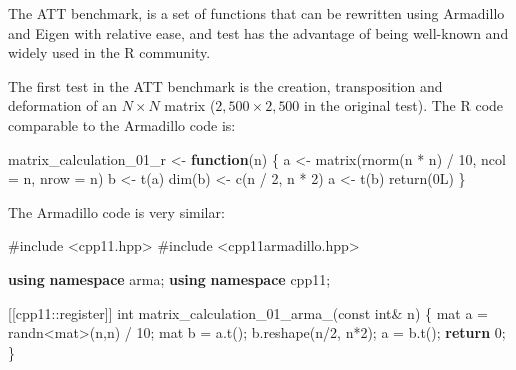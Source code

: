 \documentclass[12pt]{article}
\newenvironment{Shaded}{\begin{snugshade}}{\end{snugshade}}
\newcommand{\AttributeTok}[1]{\textcolor[rgb]{0.40,0.45,0.13}{#1}}
\newcommand{\ControlFlowTok}[1]{\textcolor[rgb]{0.00,0.23,0.31}{\textbf{#1}}}
\newcommand{\DataTypeTok}[1]{\textcolor[rgb]{0.68,0.00,0.00}{#1}}
\newcommand{\DecValTok}[1]{\textcolor[rgb]{0.68,0.00,0.00}{#1}}
\newcommand{\FunctionTok}[1]{\textcolor[rgb]{0.28,0.35,0.67}{#1}}
\newcommand{\ImportTok}[1]{\textcolor[rgb]{0.00,0.46,0.62}{#1}}
\newcommand{\KeywordTok}[1]{\textcolor[rgb]{0.00,0.23,0.31}{\textbf{#1}}}
\newcommand{\NormalTok}[1]{\textcolor[rgb]{0.00,0.23,0.31}{#1}}
\newcommand{\OperatorTok}[1]{\textcolor[rgb]{0.37,0.37,0.37}{#1}}
\newcommand{\OtherTok}[1]{\textcolor[rgb]{0.00,0.23,0.31}{#1}}
\newcommand{\PreprocessorTok}[1]{\textcolor[rgb]{0.68,0.00,0.00}{#1}}
\newcommand{\SpecialCharTok}[1]{\textcolor[rgb]{0.37,0.37,0.37}{#1}}
\newcommand{\VariableTok}[1]{\textcolor[rgb]{0.07,0.07,0.07}{#1}}
\begin{document}
The ATT benchmark, is a set of functions that can be rewritten using
Armadillo and Eigen with relative ease, and test has the advantage of
being well-known and widely used in the R community.

The first test in the ATT benchmark is the creation, transposition and
deformation of an \(N \times N\) matrix (\(2,500 \times 2,500\) in the
original test). The R code comparable to the Armadillo code is:

\begin{Shaded}
\begin{Highlighting}[]
\NormalTok{matrix\_calculation\_01\_r }\OtherTok{\textless{}{-}} \ControlFlowTok{function}\NormalTok{(n) \{}
\NormalTok{  a }\OtherTok{\textless{}{-}} \FunctionTok{matrix}\NormalTok{(}\FunctionTok{rnorm}\NormalTok{(n }\SpecialCharTok{*}\NormalTok{ n) }\SpecialCharTok{/} \DecValTok{10}\NormalTok{, }\AttributeTok{ncol =}\NormalTok{ n, }\AttributeTok{nrow =}\NormalTok{ n)}
\NormalTok{  b }\OtherTok{\textless{}{-}} \FunctionTok{t}\NormalTok{(a)}
  \FunctionTok{dim}\NormalTok{(b) }\OtherTok{\textless{}{-}} \FunctionTok{c}\NormalTok{(n }\SpecialCharTok{/} \DecValTok{2}\NormalTok{, n }\SpecialCharTok{*} \DecValTok{2}\NormalTok{)}
\NormalTok{  a }\OtherTok{\textless{}{-}} \FunctionTok{t}\NormalTok{(b)}
  \FunctionTok{return}\NormalTok{(}\DecValTok{0}\NormalTok{L)}
\NormalTok{\}}
\end{Highlighting}
\end{Shaded}

The Armadillo code is very similar:

\begin{Shaded}
\begin{Highlighting}[]
\PreprocessorTok{\#include }\ImportTok{\textless{}cpp11.hpp\textgreater{}}
\PreprocessorTok{\#include }\ImportTok{\textless{}cpp11armadillo.hpp\textgreater{}}

\KeywordTok{using} \KeywordTok{namespace}\NormalTok{ arma}\OperatorTok{;}
\KeywordTok{using} \KeywordTok{namespace}\NormalTok{ cpp11}\OperatorTok{;}

\OperatorTok{[[}\AttributeTok{cpp11}\OperatorTok{::}\AttributeTok{register}\OperatorTok{]]} \DataTypeTok{int} \VariableTok{matrix\_calculation\_01\_arma\_}\OperatorTok{(}\AttributeTok{const} \DataTypeTok{int}\OperatorTok{\&}\NormalTok{ n}\OperatorTok{)} \OperatorTok{\{}
\NormalTok{  mat a }\OperatorTok{=}\NormalTok{ randn}\OperatorTok{\textless{}}\NormalTok{mat}\OperatorTok{\textgreater{}(}\NormalTok{n}\OperatorTok{,}\NormalTok{n}\OperatorTok{)} \OperatorTok{/} \DecValTok{10}\OperatorTok{;}
\NormalTok{  mat b }\OperatorTok{=}\NormalTok{ a}\OperatorTok{.}\NormalTok{t}\OperatorTok{();}
\NormalTok{  b}\OperatorTok{.}\NormalTok{reshape}\OperatorTok{(}\NormalTok{n}\OperatorTok{/}\DecValTok{2}\OperatorTok{,}\NormalTok{ n}\OperatorTok{*}\DecValTok{2}\OperatorTok{);}
\NormalTok{  a }\OperatorTok{=}\NormalTok{ b}\OperatorTok{.}\NormalTok{t}\OperatorTok{();}
  \ControlFlowTok{return} \DecValTok{0}\OperatorTok{;}
\OperatorTok{\}}
\end{Highlighting}
\end{Shaded}
\end{document}

